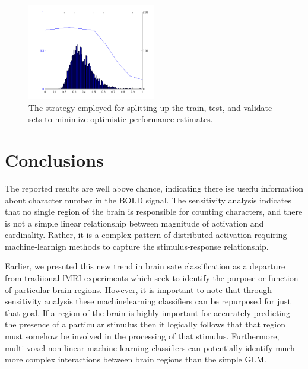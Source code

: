\documentclass[twocolumn,final]{article}
\begin{document}
\begin{figure}[!htbp]
\centering
\includegraphics[width=0.5\textwidth]{figures/sensitivity-cutoff}
\caption{The strategy employed for splitting up the train, test, and validate sets to minimize optimistic performance estimates.}
\label{fig:sensitivity-cutoff}
\end{figure}

\section{Conclusions}
The reported results are well above chance, indicating there ise useflu information about character number in the BOLD signal.
The sensitivity analysis indicates that no single region of the brain is responsible for counting characters, and there is not a simple linear relationship between magnitude of activation and cardinality.
Rather, it is a complex pattern of distributed activation requiring machine-learnign methods to capture the stimulus-response relationship.

Earlier, we presnted this new trend in brain sate classification as a departure from tradiional fMRI experiments which seek to identify the purpose or function of particular brain regions.
However, it is important to note that through sensitivity analysis these machinelearning classifiers can be repurposed for just that goal.
If a region of the brain is highly important for accurately predicting the presence of a particular stimulus then it logically follows that that region must somehow be involved in the processing of that stimulus.
Furthermore, multi-voxel non-linear machine learning classifiers can potentially identify much more complex interactions between brain regions than the simple GLM.



\end{document}
